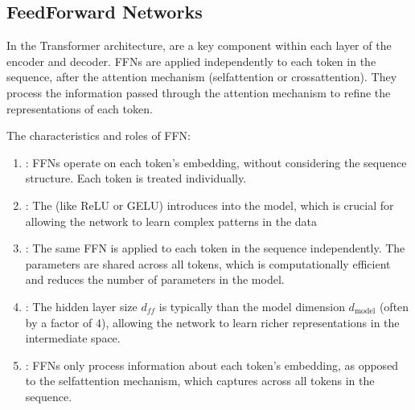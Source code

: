 \documentclass[letterpaper,11pt,english]{sphinxmanual}
\begin{document}
\subsection{Feed\sphinxhyphen{}Forward Networks}
\label{\detokenize{pretraining:feed-forward-networks}}
\sphinxAtStartPar
In the Transformer architecture,  are a
key component within each layer of the encoder and decoder. FFNs are
applied independently to each token in the sequence, after the attention
mechanism (self\sphinxhyphen{}attention or cross\sphinxhyphen{}attention). They process the
information passed through the attention mechanism to refine the
representations of each token.

\sphinxAtStartPar
The characteristics and roles of FFN:
\begin{enumerate}
%
\item {} 
\sphinxAtStartPar
{}: FFNs operate  on each
token’s embedding, without considering the sequence structure. Each
token is treated individually.

\item {} 
\sphinxAtStartPar
{}: The  (like ReLU or GELU)
introduces  into the model, which is crucial for
allowing the network to learn complex patterns in the data

\item {} 
\sphinxAtStartPar
{}: The same FFN is applied to each token in the
sequence independently. The parameters are shared across all tokens,
which is computationally efficient and reduces the number of
parameters in the model.

\item {} 
\sphinxAtStartPar
{}: The hidden layer size \(d_{ff}\) is
typically  than the model dimension
\(d_{\text{model}}\) (often by a factor of 4), allowing the
network to learn richer representations in the intermediate space.

\item {} 
\sphinxAtStartPar
{}: FFNs only process 
information about each token’s embedding, as opposed to the
self\sphinxhyphen{}attention mechanism, which captures 
across all tokens in the sequence.


\end{enumerate}
\end{document}
